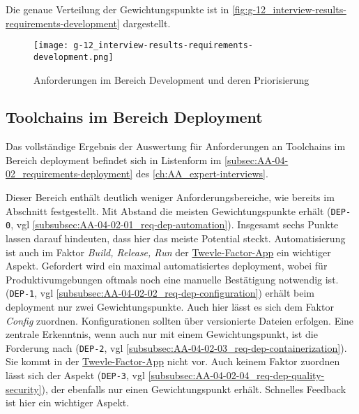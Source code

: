Die genaue Verteilung der Gewichtungspunkte ist in \autoref{fig:g-12_interview-results-requirements-development} dargestellt.

\begin{figure}[h]
    \centering
    \texttt{[image: g-12\_interview-results-requirements-development.png]}
    \caption{Anforderungen im Bereich Development und deren Priorisierung}
    \label{fig:g-12_interview-results-requirements-development}
\end{figure}

\subsection{Toolchains im Bereich Deployment}
\label{subsec:04-02-03_toolchains-in-deployment}

Das vollständige Ergebnis der Auswertung für Anforderungen an Toolchains im Bereich \Gls{deployment} befindet sich in Listenform im \autoref{subsec:AA-04-02_requirements-deployment} des \autoref{ch:AA_expert-interviews}.

Dieser Bereich enthält deutlich weniger Anforderungsbereiche, wie bereits im Abschnitt  festgestellt. Mit Abstand die meisten Gewichtungspunkte erhält \textbf{} (\texttt{DEP-0}, \acrshort{vgl} \autoref{subsubsec:AA-04-02-01_req-dep-automation}). Insgesamt sechs Punkte lassen darauf hindeuten, dass hier das meiste Potential steckt. Automatisierung ist auch im Faktor \textit{Build, Release, Run} der \hyperref[sec:03-05_basic-idea-of-twelve-factor-app]{Twevle-Factor-App} ein wichtiger Aspekt. Gefordert wird ein maximal automatisiertes \Gls{deployment}, wobei für Produktivumgebungen oftmals noch eine manuelle Bestätigung notwendig ist. \textbf{} (\texttt{DEP-1}, \acrshort{vgl} \autoref{subsubsec:AA-04-02-02_req-dep-configuration}) erhält beim \Gls{deployment} nur zwei Gewichtungspunkte. Auch hier lässt es sich dem Faktor \textit{Config} zuordnen. Konfigurationen sollten über versionierte Dateien erfolgen. Eine zentrale Erkenntnis, wenn auch nur mit einem Gewichtungspunkt, ist die Forderung nach \textbf{} (\texttt{DEP-2}, \acrshort{vgl} \autoref{subsubsec:AA-04-02-03_req-dep-containerization}). Sie kommt in der \hyperref[sec:03-05_basic-idea-of-twelve-factor-app]{Twevle-Factor-App} nicht vor. Auch keinem Faktor zuordnen lässt sich der Aspekt \textbf{} (\texttt{DEP-3}, \acrshort{vgl} \autoref{subsubsec:AA-04-02-04_req-dep-quality-security}), der ebenfalls nur einen Gewichtungspunkt erhält. Schnelles Feedback ist hier ein wichtiger Aspekt.


